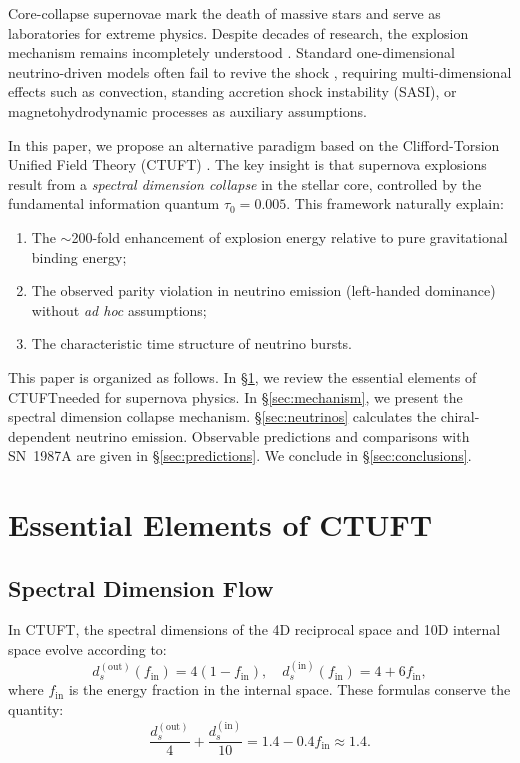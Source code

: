 \documentclass[twocolumn, tightenlines, showpacs, showkeys, nofootinbib]{revtex4-1}
\newcommand{\ctuft}{\textsc{CTUFT}}
\newcommand{\dout}{d_s^{(\text{out})}}
\newcommand{\din}{d_s^{(\text{in})}}
\newcommand{\tauzero}{\tau_0}
\begin{document}
Core-collapse supernovae mark the death of massive stars and serve as 
laboratories for extreme physics. Despite decades of research, the explosion 
mechanism remains incompletely understood \citep{Bethe1990, Janka2012}. 
Standard one-dimensional neutrino-driven models often fail to revive the shock 
\citep{Burrows2021}, requiring multi-dimensional effects such as convection, 
standing accretion shock instability (SASI), or magnetohydrodynamic processes 
as auxiliary assumptions.

In this paper, we propose an alternative paradigm based on the 
Clifford-Torsion Unified Field Theory (\ctuft) \citep{CTUFT2026}. 
The key insight is that supernova explosions result from a 
\emph{spectral dimension collapse} in the stellar core, controlled by the 
fundamental information quantum $\tauzero = 0.005$. This framework naturally 
explain:
\begin{enumerate}
    \item The $\sim$200-fold enhancement of explosion energy relative to 
          pure gravitational binding energy;
    \item The observed parity violation in neutrino emission (left-handed 
          dominance) without \textit{ad hoc} assumptions;
    \item The characteristic time structure of neutrino bursts.
\end{enumerate}

This paper is organized as follows. In \S\ref{sec:ctuft_review}, we review 
the essential elements of \ctuft needed for supernova physics. In 
\S\ref{sec:mechanism}, we present the spectral dimension collapse mechanism. 
\S\ref{sec:neutrinos} calculates the chiral-dependent neutrino emission. 
Observable predictions and comparisons with SN~1987A are given in 
\S\ref{sec:predictions}. We conclude in \S\ref{sec:conclusions}.

\section{Essential Elements of \ctuft}
\label{sec:ctuft_review}

\subsection{Spectral Dimension Flow}

In \ctuft, the spectral dimensions of the 4D reciprocal space and 10D internal 
space evolve according to:
\begin{equation}
    \dout(f_{\text{in}}) = 4(1 - f_{\text{in}}), \quad
    \din(f_{\text{in}}) = 4 + 6f_{\text{in}},
    \label{eq:spectral_flow}
\end{equation}
where $f_{\text{in}}$ is the energy fraction in the internal space. These 
formulas conserve the quantity:
\begin{equation}
    \frac{\dout}{4} + \frac{\din}{10} = 1.4 - 0.4f_{\text{in}} \approx 1.4.
\end{equation}
\end{document}
